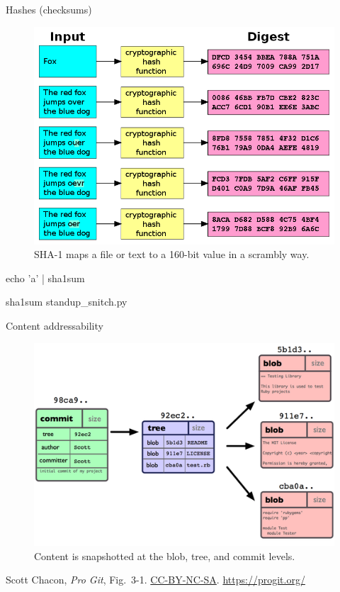 \begin{frame}[fragile]{Hashes (checksums)}
  \begin{figure}
    \includegraphics[scale=0.25]{hash_functions.png}
    \\ SHA-1 maps a file or text to a 160-bit value in a scrambly way.
  \end{figure}

  \begin{gitCommand}echo 'a' | sha1sum\end{gitCommand}

  \begin{gitCommand}sha1sum standup_snitch.py\end{gitCommand}
\end{frame}

\begin{frame}{Content addressability}
  \begin{figure}
    \includegraphics[scale=0.85]{18333fig0301-tn.png}
    \\ Content is snapshotted at the blob, tree, and commit levels.
  \end{figure}
  \footnotesize{Scott Chacon,
    \emph{Pro Git},
    Fig.~3-1.
    \href{https://creativecommons.org/licenses/by-nc-sa/3.0/legalcode}{CC-BY-NC-SA}.
    \href{https://progit.org/}{https://progit.org/}}
\end{frame}

